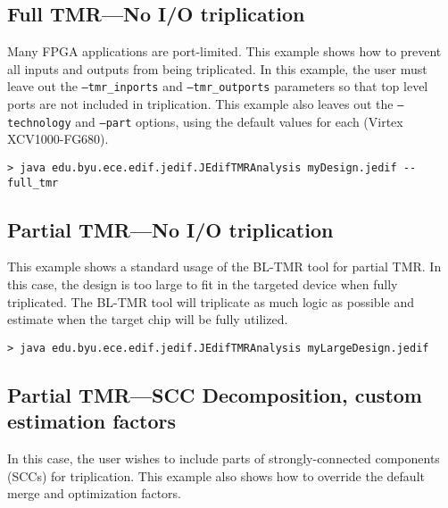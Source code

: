 \subsection{Full TMR---No I/O triplication}
Many FPGA applications are port-limited. This example shows how to prevent all 
inputs and outputs from being triplicated. In this example, the user must leave 
out the \texttt{--tmr\_inports} and \texttt{--tmr\_outports} parameters so that 
top level ports are not included in triplication. This example also leaves out 
the \texttt{--technology} and \texttt{--part} options, using the default values 
for each (Virtex XCV1000-FG680).

\begin{verbatim}
> java edu.byu.ece.edif.jedif.JEdifTMRAnalysis myDesign.jedif --full_tmr
\end{verbatim}


\subsection{Partial TMR---No I/O triplication}
This example shows a standard usage of the BL-TMR tool for partial TMR\@. In this 
case, the design is too large to fit in the targeted device when fully 
triplicated. The BL-TMR tool will triplicate as much logic as possible and 
estimate when the target chip will be fully utilized.


\begin{verbatim}
> java edu.byu.ece.edif.jedif.JEdifTMRAnalysis myLargeDesign.jedif 
\end{verbatim}


\subsection{Partial TMR---SCC Decomposition, custom estimation factors}
In this case, the user wishes to include parts of strongly-connected components 
(SCCs) for triplication. This example also shows how to override the default
merge and optimization factors.

